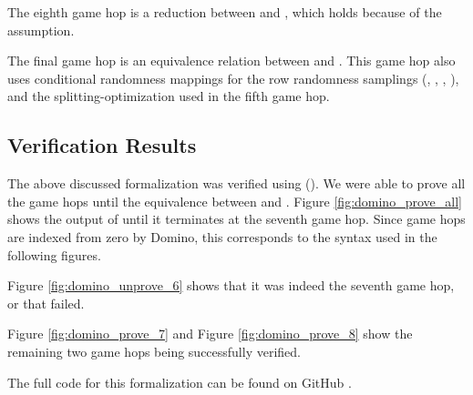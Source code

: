
The eighth game hop is a reduction between  and , which holds because of the  assumption.


The final game hop is an equivalence relation between  and  . This game hop also uses conditional randomness mappings for the row randomness samplings (, , , ), and the splitting-optimization used in the fifth game hop. 

\subsection{Verification Results}
\label{subsec:results}
The above discussed formalization was verified using (). We were able to prove all the game hops until the equivalence between   and . Figure \ref{fig:domino_prove_all} shows the output of  until it terminates at the seventh game hop. Since game hops are indexed from zero by Domino, this corresponds to the  syntax used in the following figures.



Figure \ref{fig:domino_unprove_6} shows that it was indeed the seventh game hop, or  that failed.



Figure \ref{fig:domino_prove_7} and Figure \ref{fig:domino_prove_8} show the remaining two game hops being successfully verified.





The full code for this formalization can be found on GitHub \cite{prateekfreexor:code}.
